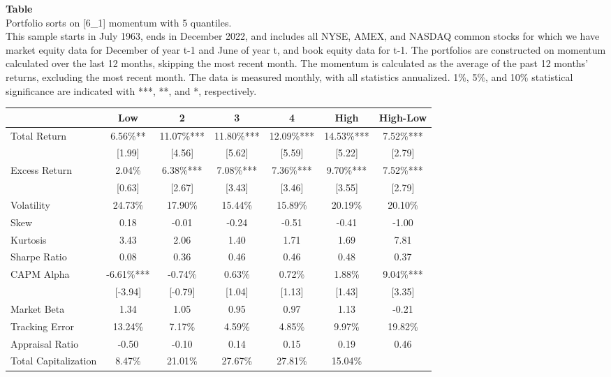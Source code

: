 \begin{table*}[ht!]
\raggedright
{}
\label{tab: quantile_sort_mom_[6_1]_with_5_quantiles}
\textbf{Table \thetable} \\
Portfolio sorts on [6\_1] momentum with 5 quantiles. \\
\hspace*{1em}This sample starts in July 1963, ends in December 2022, and includes all NYSE, AMEX, and NASDAQ common stocks for which we have market equity data for December of year t-1 and June of year t, and book equity data for t-1. The portfolios are constructed on momentum calculated over the last 12 months, skipping the most recent month. The momentum is calculated as the average of the past 12 months' returns, excluding the most recent month. The data is measured monthly, with all statistics annualized.  1\%, 5\%, and 10\% statistical significance are indicated with ***, **, and *, respectively. \\
\vspace{0.5em}
\centering
\begin{adjustbox}{max width=\textwidth}
\begin{tabular}{@{}lcccccc@{}}
\toprule
 & Low & 2 & 3 & 4 & High & High-Low \\
\midrule
Total Return & 6.56\%** & 11.07\%*** & 11.80\%*** & 12.09\%*** & 14.53\%*** & 7.52\%*** \\
 & [1.99] & [4.56] & [5.62] & [5.59] & [5.22] & [2.79] \\
Excess Return & 2.04\% & 6.38\%*** & 7.08\%*** & 7.36\%*** & 9.70\%*** & 7.52\%*** \\
 & [0.63] & [2.67] & [3.43] & [3.46] & [3.55] & [2.79] \\
Volatility & 24.73\% & 17.90\% & 15.44\% & 15.89\% & 20.19\% & 20.10\% \\
Skew & 0.18 & -0.01 & -0.24 & -0.51 & -0.41 & -1.00 \\
Kurtosis & 3.43 & 2.06 & 1.40 & 1.71 & 1.69 & 7.81 \\
Sharpe Ratio & 0.08 & 0.36 & 0.46 & 0.46 & 0.48 & 0.37 \\
CAPM Alpha & -6.61\%*** & -0.74\% & 0.63\% & 0.72\% & 1.88\% & 9.04\%*** \\
 & [-3.94] & [-0.79] & [1.04] & [1.13] & [1.43] & [3.35] \\
Market Beta & 1.34 & 1.05 & 0.95 & 0.97 & 1.13 & -0.21 \\
Tracking Error & 13.24\% & 7.17\% & 4.59\% & 4.85\% & 9.97\% & 19.82\% \\
Appraisal Ratio & -0.50 & -0.10 & 0.14 & 0.15 & 0.19 & 0.46 \\
Total Capitalization & 8.47\% & 21.01\% & 27.67\% & 27.81\% & 15.04\% &  \\
\bottomrule
\end{tabular}
\end{adjustbox}
\end{table*}